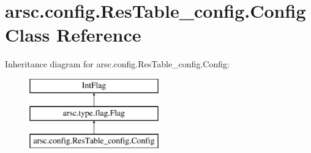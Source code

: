 \hypertarget{classarsc_1_1config_1_1ResTable__config_1_1Config}{}\section{arsc.\+config.\+Res\+Table\+\_\+config.\+Config Class Reference}
\label{classarsc_1_1config_1_1ResTable__config_1_1Config}
Inheritance diagram for arsc.\+config.\+Res\+Table\+\_\+config.\+Config\+:\begin{figure}[H]
\begin{center}
\leavevmode
\includegraphics[height=3.000000cm]{classarsc_1_1config_1_1ResTable__config_1_1Config}
\end{center}
\end{figure}
